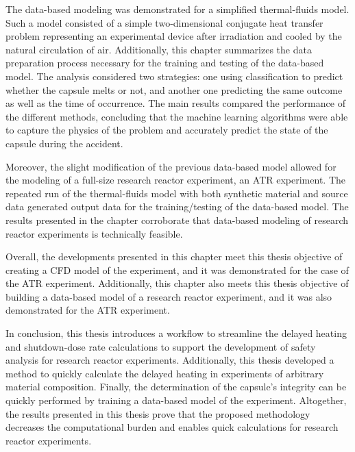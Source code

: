 The data-based modeling was demonstrated for a simplified thermal-fluids model.
Such a model consisted of a simple two-dimensional conjugate heat transfer problem representing an experimental device after irradiation and cooled by the natural circulation of air.
Additionally, this chapter summarizes the data preparation process necessary for the training and testing of the data-based model.
The analysis considered two strategies: one using classification to predict whether the capsule melts or not, and another one predicting the same outcome as well as the time of occurrence.
The main results compared the performance of the different methods, concluding that the machine learning algorithms were able to capture the physics of the problem and accurately predict the state of the capsule during the accident.

Moreover, the slight modification of the previous data-based model allowed for the modeling of a full-size research reactor experiment, an ATR experiment.
The repeated run of the thermal-fluids model with both synthetic material and source data generated output data for the training/testing of the data-based model.
The results presented in the chapter corroborate that data-based modeling of research reactor experiments is technically feasible.

Overall, the developments presented in this chapter meet this thesis objective of creating a CFD model of the experiment, and it was demonstrated for the case of the ATR experiment.
Additionally, this chapter also meets this thesis objective of building a data-based model of a research reactor experiment, and it was also demonstrated for the ATR experiment.

In conclusion, this thesis introduces a workflow to streamline the delayed heating and shutdown-dose rate calculations to support the development of safety analysis for research reactor experiments.
Additionally, this thesis developed a method to quickly calculate the delayed heating in experiments of arbitrary material composition.
Finally, the determination of the capsule's integrity can be quickly performed by training a data-based model of the experiment.
Altogether, the results presented in this thesis prove that the proposed methodology decreases the computational burden and enables quick calculations for research reactor experiments.




